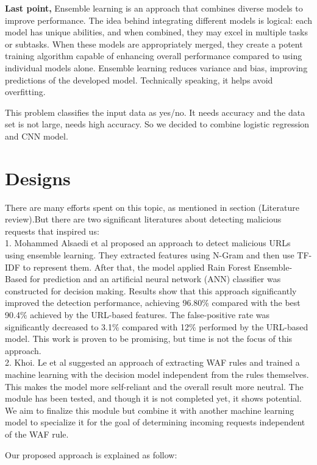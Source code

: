 \textbf{Last point,}
Ensemble learning is an approach that combines diverse models to improve performance. The idea behind integrating different models is logical: each model has unique abilities, and when combined, they may excel in multiple tasks or subtasks. When these models are appropriately merged, they create a potent training algorithm capable of enhancing overall performance compared to using individual models alone.
Ensemble learning reduces variance and bias, improving predictions of the developed model. Technically speaking, it helps avoid overfitting.

This problem classifies the input data as yes/no. It needs accuracy and the data set is not large, needs high accuracy. So we decided to combine logistic regression and CNN model.


\section{Designs}
\label{design}
There are many efforts spent on this topic, as mentioned in section (Literature review).But there are two significant literatures about detecting malicious requests that inspired us: \\
1. Mohammed Alsaedi et al\cite{s22093373} proposed an approach to detect malicious URLs using ensemble learning. They extracted features using N-Gram and then use TF-IDF to represent them. After that, the model applied Rain Forest Ensemble-Based for prediction and an artificial neural network (ANN) classifier was constructed for decision making. Results show that this approach significantly improved the detection performance, achieving 96.80\% compared with the best 90.4\% achieved by the URL-based features. The false-positive rate was significantly decreased to 3.1\% compared with 12\% performed by the URL-based model. This work is proven to be promising, but time is not the focus of this approach. \\
2. Khoi. Le et al\cite{Khoi} suggested an approach of extracting WAF rules and trained a machine learning with the decision model independent from the rules themselves. This makes the model more self-reliant and the overall result more neutral. The module has been tested, and though it is not completed yet, it shows potential. We aim to finalize this module but combine it with another machine learning model to specialize it for the goal of determining incoming requests independent of the WAF rule.

Our proposed approach is explained as follow:

